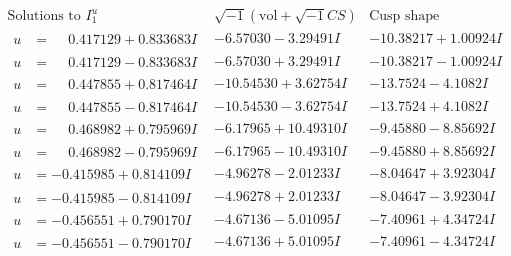 \documentclass[1p]{elsarticle_modified}
\theoremstyle{definition}
\newcommand{\I}{\sqrt{-1}}
\begin{document}
$$\begin{array}{c|c|c}  
\text{Solutions to }I^u_{1}& \I (\text{vol} + \sqrt{-1}CS) & \text{Cusp shape}\\
 \hline 
\begin{aligned}
u &= \phantom{-}0.417129 + 0.833683 I\end{aligned}
 & -6.57030 - 3.29491 I & -10.38217 + 1.00924 I \\ \hline\begin{aligned}
u &= \phantom{-}0.417129 - 0.833683 I\end{aligned}
 & -6.57030 + 3.29491 I & -10.38217 - 1.00924 I \\ \hline\begin{aligned}
u &= \phantom{-}0.447855 + 0.817464 I\end{aligned}
 & -10.54530 + 3.62754 I & -13.7524 - 4.1082 I \\ \hline\begin{aligned}
u &= \phantom{-}0.447855 - 0.817464 I\end{aligned}
 & -10.54530 - 3.62754 I & -13.7524 + 4.1082 I \\ \hline\begin{aligned}
u &= \phantom{-}0.468982 + 0.795969 I\end{aligned}
 & -6.17965 + 10.49310 I & -9.45880 - 8.85692 I \\ \hline\begin{aligned}
u &= \phantom{-}0.468982 - 0.795969 I\end{aligned}
 & -6.17965 - 10.49310 I & -9.45880 + 8.85692 I \\ \hline\begin{aligned}
u &= -0.415985 + 0.814109 I\end{aligned}
 & -4.96278 - 2.01233 I & -8.04647 + 3.92304 I \\ \hline\begin{aligned}
u &= -0.415985 - 0.814109 I\end{aligned}
 & -4.96278 + 2.01233 I & -8.04647 - 3.92304 I \\ \hline\begin{aligned}
u &= -0.456551 + 0.790170 I\end{aligned}
 & -4.67136 - 5.01095 I & -7.40961 + 4.34724 I \\ \hline\begin{aligned}
u &= -0.456551 - 0.790170 I\end{aligned}
 & -4.67136 + 5.01095 I & -7.40961 - 4.34724 I \\ \hline\begin{aligned}

\end{aligned}
\end{array}$$
\end{document}
